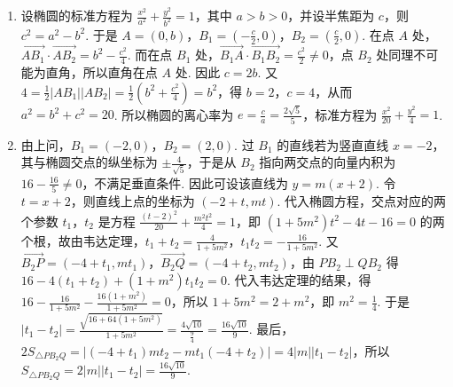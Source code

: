 \begin{solution}
\begin{enumerate}
\item 设椭圆的标准方程为 \(\frac{x^2}{a^2}+\frac{y^2}{b^2}=1\)，其中 \(a>b>0\)，并设半焦距为 \(c\)，则 \(c^2=a^2-b^2\). 于是 \(A=(0,b)\)，\(B_1=\left(-\frac{c}{2},0\right)\)，\(B_2=\left(\frac{c}{2},0\right)\). 在点 \(A\) 处，\(\overrightarrow{AB_1}\cdot\overrightarrow{AB_2}=b^2-\frac{c^2}{4}\). 而在点 \(B_1\) 处，\(\overrightarrow{B_1A}\cdot\overrightarrow{B_1B_2}=\frac{c^2}{2}\ne0\)，点 \(B_2\) 处同理不可能为直角，所以直角在点 \(A\) 处. 因此 \(c=2b\). 又 \(4=\frac12|AB_1||AB_2|=\frac12\left(b^2+\frac{c^2}{4}\right)=b^2\)，得 \(b=2\)，\(c=4\)，从而 \(a^2=b^2+c^2=20\). 所以椭圆的离心率为 \(e=\frac ca=\frac{2\sqrt5}{5}\)，标准方程为 \(\frac{x^2}{20}+\frac{y^2}{4}=1\).
\item 由上问，\(B_1=(-2,0)\)，\(B_2=(2,0)\). 过 \(B_1\) 的直线若为竖直直线 \(x=-2\)，其与椭圆交点的纵坐标为 \(\pm\frac{4}{\sqrt5}\)，于是从 \(B_2\) 指向两交点的向量内积为 \(16-\frac{16}{5}\ne0\)，不满足垂直条件. 因此可设该直线为 \(y=m(x+2)\). 令 \(t=x+2\)，则直线上点的坐标为 \((-2+t,mt)\). 代入椭圆方程，交点对应的两个参数 \(t_1\)，\(t_2\) 是方程 \(\frac{(t-2)^2}{20}+\frac{m^2t^2}{4}=1\)，即 \((1+5m^2)t^2-4t-16=0\) 的两个根，故由韦达定理，\(t_1+t_2=\frac{4}{1+5m^2}\)，\(t_1t_2=-\frac{16}{1+5m^2}\). 又 \(\overrightarrow{B_2P}=(-4+t_1,mt_1)\)，\(\overrightarrow{B_2Q}=(-4+t_2,mt_2)\)，由 \(PB_2\perp QB_2\) 得 \(16-4(t_1+t_2)+(1+m^2)t_1t_2=0\). 代入韦达定理的结果，得 \(16-\frac{16}{1+5m^2}-\frac{16(1+m^2)}{1+5m^2}=0\)，所以 \(1+5m^2=2+m^2\)，即 \(m^2=\frac14\). 于是 \(|t_1-t_2|=\frac{\sqrt{16+64(1+5m^2)}}{1+5m^2}=\frac{4\sqrt{10}}{\frac{9}{4}}=\frac{16\sqrt{10}}9\). 最后，\(2S_{\triangle PB_2Q}=\left|(-4+t_1)mt_2-mt_1(-4+t_2)\right|=4|m||t_1-t_2|\)，所以 \(S_{\triangle PB_2Q}=2|m||t_1-t_2|=\frac{16\sqrt{10}}9\).
\end{enumerate}
\end{solution}
